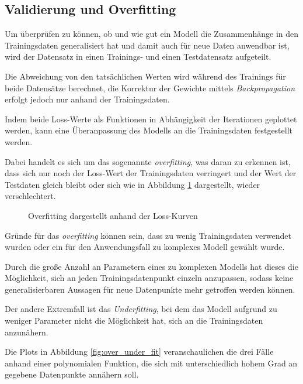 \subsection{Validierung und Overfitting}\label{subsec:validation}

Um überprüfen zu können, ob und wie gut ein Modell die Zusammenhänge
in den Trainingsdaten generalisiert hat und damit auch für neue
 Daten anwendbar ist, wird der Datensatz in einen Trainings- und
einen Testdatensatz aufgeteilt.

Die Abweichung von den tatsächlichen Werten wird während
des Trainings für beide Datensätze 
berechnet, die Korrektur der Gewichte mittels
\textit{Backpropagation} erfolgt jedoch nur anhand
der Trainingsdaten.

Indem beide Loss-Werte als Funktionen in Abhängigkeit 
der Iterationen geplottet werden, kann eine Überanpassung
des Modells an die Trainingsdaten festgestellt werden.

Dabei handelt es sich um das sogenannte \textit{\Gls{overfitting}},
was daran zu erkennen ist, dass sich nur noch der Loss-Wert der 
Trainingsdaten verringert und der Wert der Testdaten 
gleich bleibt oder sich wie in Abbildung \ref{fig:overfitting}
dargestellt, wieder verschlechtert.
\vspace{1cm}

\begin{figure}[H]
    \centering
    \def\svgwidth{0.5\textwidth}
    
    \caption{Overfitting dargestellt anhand der Loss-Kurven}
    \label{fig:overfitting}
\end{figure}
\vspace{1cm}

Gründe für das \textit{\Gls{overfitting}} können sein,
dass zu wenig Trainingsdaten
verwendet wurden oder ein für den Anwendungsfall 
zu komplexes Modell gewählt wurde.

Durch die große Anzahl an Parametern eines zu komplexen Modells
hat dieses die Möglichkeit, sich an jeden Trainingsdatenpunkt einzeln
anzupassen, sodass keine generalisierbaren 
Aussagen für neue Datenpunkte mehr getroffen werden können.

Der andere Extremfall ist das \textit{Underfitting}, 
bei dem das Modell aufgrund zu weniger Parameter nicht die 
Möglichkeit hat, sich an die Trainingsdaten anzunähern.

Die Plots in Abbildung \ref{fig:over_under_fit} veranschaulichen 
die drei Fälle anhand einer polynomialen Funktion, die sich 
mit unterschiedlich hohem Grad an gegebene Datenpunkte 
annähern soll.

